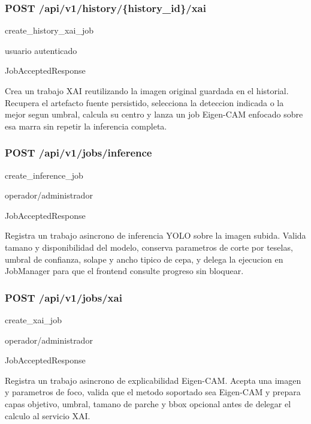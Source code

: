 \subsubsection*{POST /api/v1/history/\{history\_id\}/xai}
\begin{description}[leftmargin=2.8cm,style=nextline]
\item[Handler] create\_history\_xai\_job
\item[Acceso] usuario autenticado
\item[Respuesta] JobAcceptedResponse
\end{description}
Crea un trabajo XAI reutilizando la imagen original guardada en el historial. Recupera el artefacto fuente persistido, selecciona la deteccion indicada o la mejor segun umbral, calcula su centro y lanza un job Eigen-CAM enfocado sobre esa marra sin repetir la inferencia completa.


\subsubsection*{POST /api/v1/jobs/inference}
\begin{description}[leftmargin=2.8cm,style=nextline]
\item[Handler] create\_inference\_job
\item[Acceso] operador/administrador
\item[Respuesta] JobAcceptedResponse
\end{description}
Registra un trabajo asincrono de inferencia YOLO sobre la imagen subida. Valida tamano y disponibilidad del modelo, conserva parametros de corte por teselas, umbral de confianza, solape y ancho tipico de cepa, y delega la ejecucion en JobManager para que el frontend consulte progreso sin bloquear.


\subsubsection*{POST /api/v1/jobs/xai}
\begin{description}[leftmargin=2.8cm,style=nextline]
\item[Handler] create\_xai\_job
\item[Acceso] operador/administrador
\item[Respuesta] JobAcceptedResponse
\end{description}
Registra un trabajo asincrono de explicabilidad Eigen-CAM. Acepta una imagen y parametros de foco, valida que el metodo soportado sea Eigen-CAM y prepara capas objetivo, umbral, tamano de parche y bbox opcional antes de delegar el calculo al servicio XAI.


